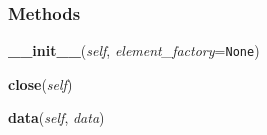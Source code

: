     \label{xml:etree:ElementTree:TreeBuilder}


  \subsubsection{Methods}

    \label{xml:etree:ElementTree:TreeBuilder:__init__}

    \vspace{0.5ex}

\hspace{.8\funcindent}\begin{boxedminipage}{\funcwidth}

    \raggedright \textbf{\_\_init\_\_}(\textit{self}, \textit{element\_factory}={\tt None})

\setlength{\parskip}{2ex}
\setlength{\parskip}{1ex}
    \end{boxedminipage}

    \label{xml:etree:ElementTree:TreeBuilder:close}

    \vspace{0.5ex}

\hspace{.8\funcindent}\begin{boxedminipage}{\funcwidth}

    \raggedright \textbf{close}(\textit{self})

\setlength{\parskip}{2ex}
\setlength{\parskip}{1ex}
    \end{boxedminipage}

    \label{xml:etree:ElementTree:TreeBuilder:data}

    \vspace{0.5ex}

\hspace{.8\funcindent}\begin{boxedminipage}{\funcwidth}

    \raggedright \textbf{data}(\textit{self}, \textit{data})

\setlength{\parskip}{2ex}
\setlength{\parskip}{1ex}
    \end{boxedminipage}

